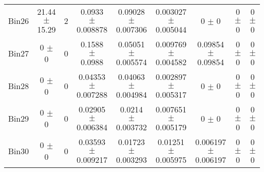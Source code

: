 \begin{tabular}{@{\extracolsep{4pt}}lcccccccc@{}}
     Bin26 & 21.44 $\pm$ 15.29 & 2 & 0.0933 $\pm$ 0.008878 & 0.09028 $\pm$ 0.007306 & 0.003027 $\pm$ 0.005044 & 0 $\pm$ 0 & 0 $\pm$ 0 & 0 $\pm$ 0 \\ 
     Bin27 & 0 $\pm$ 0 & 0 & 0.1588 $\pm$ 0.0988 & 0.05051 $\pm$ 0.005574 & 0.009769 $\pm$ 0.004582 & 0.09854 $\pm$ 0.09854 & 0 $\pm$ 0 & 0 $\pm$ 0 \\ 
     Bin28 & 0 $\pm$ 0 & 0 & 0.04353 $\pm$ 0.007288 & 0.04063 $\pm$ 0.004984 & 0.002897 $\pm$ 0.005317 & 0 $\pm$ 0 & 0 $\pm$ 0 & 0 $\pm$ 0 \\ 
     Bin29 & 0 $\pm$ 0 & 0 & 0.02905 $\pm$ 0.006384 & 0.0214 $\pm$ 0.003732 & 0.007651 $\pm$ 0.005179 & 0 $\pm$ 0 & 0 $\pm$ 0 & 0 $\pm$ 0 \\ 
     Bin30 & 0 $\pm$ 0 & 0 & 0.03593 $\pm$ 0.009217 & 0.01723 $\pm$ 0.003293 & 0.01251 $\pm$ 0.005975 & 0.006197 $\pm$ 0.006197 & 0 $\pm$ 0 & 0 $\pm$ 0 \\ 
\hline\hline
  \end{tabular}
